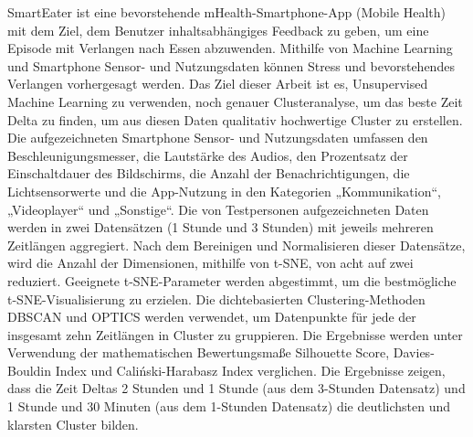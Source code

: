 SmartEater ist eine bevorstehende mHealth-Smartphone-App (Mobile Health) mit dem Ziel, dem Benutzer inhaltsabhängiges Feedback zu geben, um eine Episode mit Verlangen nach Essen abzuwenden. Mithilfe von Machine Learning und Smartphone Sensor- und Nutzungsdaten können Stress und bevorstehendes Verlangen vorhergesagt werden. Das Ziel dieser Arbeit ist es, Unsupervised Machine Learning zu verwenden, noch genauer Clusteranalyse, um das beste Zeit Delta zu finden, um aus diesen Daten qualitativ hochwertige Cluster zu erstellen. Die aufgezeichneten Smartphone Sensor- und Nutzungsdaten umfassen den Beschleunigungsmesser, die Lautstärke des Audios, den Prozentsatz der Einschaltdauer des Bildschirms, die Anzahl der Benachrichtigungen, die Lichtsensorwerte und die App-Nutzung in den Kategorien „Kommunikation“, „Videoplayer“ und „Sonstige“. Die von Testpersonen aufgezeichneten Daten werden in zwei Datensätzen (1 Stunde und 3 Stunden) mit jeweils mehreren Zeitlängen aggregiert. Nach dem Bereinigen und Normalisieren dieser Datensätze, wird die Anzahl der Dimensionen, mithilfe von t-SNE, von acht auf zwei reduziert. Geeignete t-SNE-Parameter werden abgestimmt, um die bestmögliche t-SNE-Visualisierung zu erzielen. Die dichtebasierten Clustering-Methoden DBSCAN und OPTICS werden verwendet, um Datenpunkte für jede der insgesamt zehn Zeitlängen in Cluster zu gruppieren. Die Ergebnisse werden unter Verwendung der mathematischen Bewertungsmaße Silhouette Score, Davies-Bouldin Index und Caliński-Harabasz Index verglichen. Die Ergebnisse zeigen, dass die Zeit Deltas 2 Stunden und 1 Stunde (aus dem 3-Stunden Datensatz) und 1 Stunde und 30 Minuten (aus dem 1-Stunden Datensatz) die deutlichsten und klarsten Cluster bilden.